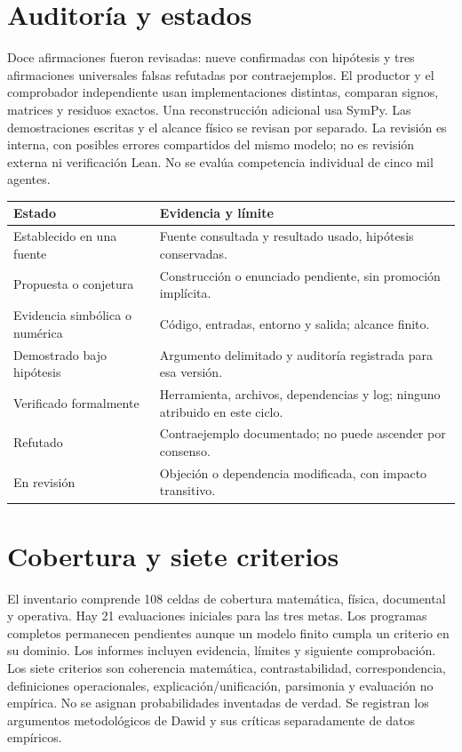\documentclass[11pt,a4paper]{article}
\begin{document}
\section{Auditoría y estados}
Doce afirmaciones fueron revisadas: nueve confirmadas con hipótesis y tres
afirmaciones universales falsas refutadas por contraejemplos. El productor y el
comprobador independiente usan implementaciones distintas, comparan signos,
matrices y residuos exactos. Una reconstrucción adicional usa SymPy.
Las demostraciones escritas y el alcance físico se revisan por separado.
La revisión es interna, con posibles errores compartidos del mismo modelo;
no es revisión externa ni verificación Lean. No se evalúa competencia individual
de cinco mil agentes.

\begin{longtable}{p{.29\linewidth}p{.62\linewidth}}
\toprule Estado & Evidencia y límite\\\midrule
Establecido en una fuente & Fuente consultada y resultado usado, hipótesis conservadas.\\
Propuesta o conjetura & Construcción o enunciado pendiente, sin promoción implícita.\\
Evidencia simbólica o numérica & Código, entradas, entorno y salida; alcance finito.\\
Demostrado bajo hipótesis & Argumento delimitado y auditoría registrada para esa versión.\\
Verificado formalmente & Herramienta, archivos, dependencias y log; ninguno atribuido en este ciclo.\\
Refutado & Contraejemplo documentado; no puede ascender por consenso.\\
En revisión & Objeción o dependencia modificada, con impacto transitivo.\\\bottomrule
\end{longtable}

\section{Cobertura y siete criterios}
El inventario comprende 108 celdas de cobertura matemática, física, documental y
operativa. Hay 21 evaluaciones iniciales para las tres metas. Los programas
completos permanecen pendientes aunque un modelo finito cumpla un criterio en
su dominio. Los informes incluyen evidencia, límites y siguiente comprobación.
Los siete criterios son coherencia matemática, contrastabilidad, correspondencia,
definiciones operacionales, explicación/unificación, parsimonia y evaluación no
empírica. No se asignan probabilidades inventadas de verdad. Se registran los
argumentos metodológicos de Dawid y sus críticas separadamente de datos empíricos.
\end{document}
